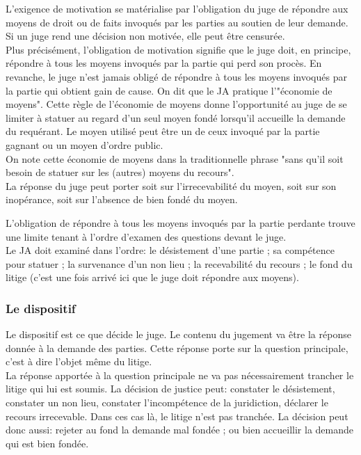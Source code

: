 \documentclass[10pt, a4paper, openany]{book}
\begin{document}
L'exigence de motivation se matérialise par l'obligation du juge de répondre aux moyens de droit ou de faits invoqués par les parties au soutien de leur demande. Si un juge rend une décision non motivée, elle peut être censurée. \\
Plus précisément, l'obligation de motivation signifie que le juge doit, en principe, répondre à tous les moyens invoqués par la partie qui perd son procès. En revanche, le juge n'est jamais obligé de répondre à tous les moyens invoqués par la partie qui obtient gain de cause. On dit que le JA pratique l'"économie de moyens". Cette règle de l'économie de moyens donne l'opportunité au juge de se limiter à statuer au regard d'un seul moyen fondé lorsqu'il accueille la demande du requérant. Le moyen utilisé peut être un de ceux invoqué par la partie gagnant ou un moyen d'ordre public. \\
On note cette économie de moyens dans la traditionnelle phrase "sans qu'il soit besoin de statuer sur les (autres) moyens du recours". \\
La réponse du juge peut porter soit sur l'irrecevabilité du moyen, soit sur son inopérance, soit sur l'absence de bien fondé du moyen. 


L'obligation de répondre à tous les moyens invoqués par la partie perdante trouve une limite tenant à l'ordre d'examen des questions devant le juge. \\
Le JA doit examiné dans l'ordre: le désistement d'une partie ; sa compétence pour statuer ; la survenance d'un non lieu ; la recevabilité du recours ; le fond du litige (c'est une fois arrivé ici que le juge doit répondre aux moyens). 

\subsubsection{Le dispositif}

Le dispositif est ce que décide le juge. Le contenu du jugement va être la réponse donnée à la demande des parties. Cette réponse porte sur la question principale, c'est à dire l'objet même du litige. \\
La réponse apportée à la question principale ne va pas nécessairement trancher le litige qui lui est soumis. La décision de justice peut: constater le désistement, constater un non lieu, constater l'incompétence de la juridiction, déclarer le recours irrecevable. Dans ces cas là, le litige n'est pas tranchée. La décision peut donc aussi: rejeter au fond la demande mal fondée ; ou bien accueillir la demande qui est bien fondée.
\end{document}
